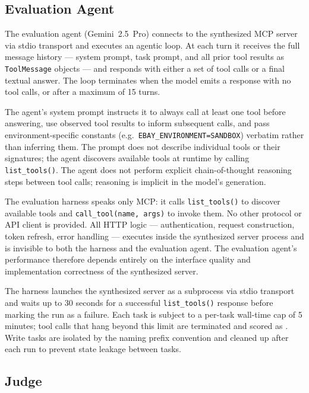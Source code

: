 \subsection{Evaluation Agent}

The evaluation agent (Gemini~2.5~Pro) connects to the synthesized MCP server via stdio transport and executes an agentic loop. At each turn it receives the full message history --- system prompt, task prompt, and all prior tool results as \texttt{ToolMessage} objects --- and responds with either a set of tool calls or a final textual answer. The loop terminates when the model emits a response with no tool calls, or after a maximum of 15 turns.

The agent's system prompt instructs it to always call at least one tool before answering, use observed tool results to inform subsequent calls, and pass environment-specific constants (e.g.\ \texttt{EBAY\_ENVIRONMENT=SANDBOX}) verbatim rather than inferring them. The prompt does not describe individual tools or their signatures; the agent discovers available tools at runtime by calling \texttt{list\_tools()}. The agent does not perform explicit chain-of-thought reasoning steps between tool calls; reasoning is implicit in the model's generation.

The evaluation harness speaks only MCP: it calls \texttt{list\_tools()} to discover available tools and \texttt{call\_tool(name, args)} to invoke them.
No other protocol or API client is provided. All HTTP logic --- authentication, request construction, token refresh, error handling --- executes inside the synthesized server process and is invisible to both the harness and the evaluation agent. The evaluation agent's performance therefore depends entirely on the interface quality and implementation correctness of the synthesized server.

The harness launches the synthesized server as a subprocess via stdio transport and waits up to 30 seconds for a successful \texttt{list\_tools()} response before marking the run as a  failure. Each task is subject to a per-task wall-time cap of 5 minutes; tool calls that hang beyond this limit are terminated and scored as . Write tasks are isolated by the naming prefix convention and cleaned up after each run to prevent state leakage between tasks.

\subsection{Judge}

